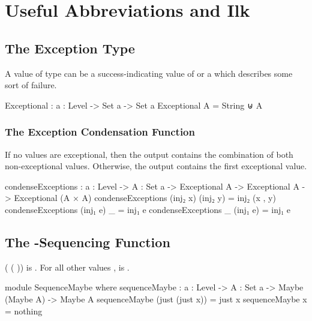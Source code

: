 \documentclass{report}
\begin{document}
\chapter{Useful Abbreviations and Ilk}

\section{The Exception Type}
A value of type   can be a success-indicating value of  or a  which describes some sort of failure.

\begin{code}
Exceptional : {a : Level} -> Set a -> Set a
Exceptional A = String ⊎ A
\end{code}

\subsection{The Exception Condensation Function}
If no values are exceptional, then the output contains the combination of both non-exceptional values.  Otherwise, the output contains the first exceptional value.

\begin{code}
condenseExceptions : {a : Level} ->
                     {A : Set a} ->
                     Exceptional A ->
                     Exceptional A ->
                     Exceptional (A × A)
condenseExceptions (inj₂ x) (inj₂ y) = inj₂ (x , y)
condenseExceptions (inj₁ e) _ = inj₁ e
condenseExceptions _ (inj₁ e) = inj₁ e
\end{code}

\section{The -Sequencing Function}
 \AgdaSymbol( \AgdaSymbol( \AgdaSymbol)\AgdaSymbol) is  .  For all other values ,   is .

\begin{code}
module SequenceMaybe where
  sequenceMaybe : {a : Level} ->
                  {A : Set a} ->
                  Maybe (Maybe A) ->
                  Maybe A
  sequenceMaybe (just (just x)) = just x
  sequenceMaybe x = nothing
\end{code}
\end{document}
